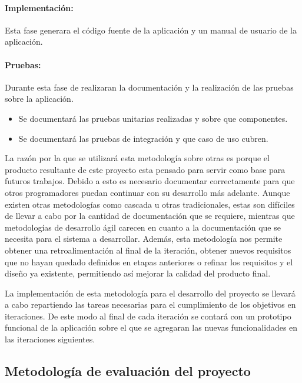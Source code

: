 \documentclass[11pt,letterpaper]{article}
\begin{document}
\paragraph{Implementación:} Esta fase generara el código fuente de la aplicación y un manual de usuario de la aplicación.
\paragraph{Pruebas:} Durante esta fase de realizaran la documentación y la realización de las pruebas sobre la aplicación.
\begin{itemize}
	\item Se documentará las pruebas unitarias realizadas y sobre que componentes.
	\item Se documentará las pruebas de integración y que caso de uso cubren.
\end{itemize}

La razón por la que se utilizará esta metodología sobre otras es porque el producto resultante de este proyecto esta pensado para servir como base para futuros trabajos. Debido a esto es necesario documentar correctamente para que otros programadores puedan continuar con su desarrollo más adelante. Aunque existen otras metodologías como cascada u otras tradicionales, estas son difíciles de llevar a cabo por la cantidad de documentación que se requiere, mientras que metodologías de desarrollo ágil carecen en cuanto a la documentación que se necesita para el sistema a desarrollar. Además, esta metodología nos permite obtener una retroalimentación al final de la iteración, obtener nuevos requisitos que no hayan quedado definidos en etapas anteriores o refinar los requisitos y el diseño ya existente, permitiendo así mejorar la calidad del producto final.

La implementación de esta metodología para el desarrollo del proyecto se llevará a cabo repartiendo las tareas necesarias para el cumplimiento de los objetivos en iteraciones. De este modo al final de cada iteración se contará con un prototipo funcional de la aplicación sobre el que se agregaran las nuevas funcionalidades en las iteraciones siguientes.

\subsection{Metodología de evaluación del proyecto}
\end{document}
